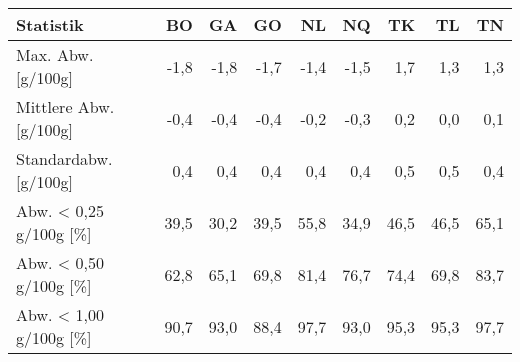 \begin{tabular}{lrrrrrrrr}
\toprule
             Statistik &   BO &   GA &   GO &   NL &   NQ &   TK &   TL &   TN \\
\midrule
    Max. Abw. [g/100g] & -1,8 & -1,8 & -1,7 & -1,4 & -1,5 &  1,7 &  1,3 &  1,3 \\
Mittlere Abw. [g/100g] & -0,4 & -0,4 & -0,4 & -0,2 & -0,3 &  0,2 &  0,0 &  0,1 \\
Standardabw. [g/100g]  &  0,4 &  0,4 &  0,4 &  0,4 &  0,4 &  0,5 &  0,5 &  0,4 \\
Abw. < 0,25 g/100g [\%] & 39,5 & 30,2 & 39,5 & 55,8 & 34,9 & 46,5 & 46,5 & 65,1 \\
Abw. < 0,50 g/100g [\%] & 62,8 & 65,1 & 69,8 & 81,4 & 76,7 & 74,4 & 69,8 & 83,7 \\
Abw. < 1,00 g/100g [\%] & 90,7 & 93,0 & 88,4 & 97,7 & 93,0 & 95,3 & 95,3 & 97,7 \\
\bottomrule
\end{tabular}
